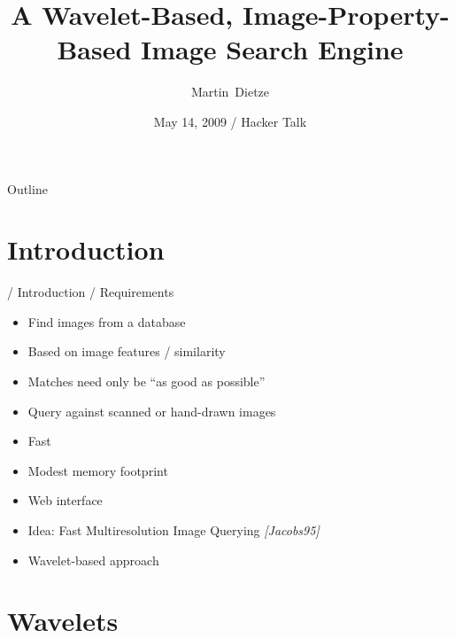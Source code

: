 \documentclass{beamer}
\title[Wavelet-Based Image Search] %
{A Wavelet-Based, Image-Property-Based Image Search Engine}
\author{Martin~Dietze}
\institute{Freiheit.com Technologies}
\date[Short Occasion] %
{May 14, 2009 / Hacker Talk}
\begin{document}
\begin{frame}
  \titlepage
\end{frame}

\begin{frame}{Outline}
  \tableofcontents
\end{frame}



\section{Introduction}

\begin{frame}{/ Introduction / Requirements}

  \begin{itemize}
  \item Find images from a database
  \item Based on image features / similarity
  \item Matches need only be ``as good as possible''
  \item Query against scanned or hand-drawn images
  \end{itemize}

  \pause
  \begin{itemize}
  \item Fast
  \item Modest memory footprint
  \item Web interface
  \end{itemize}

  \pause
  \begin{itemize}
  \item Idea: Fast Multiresolution Image Querying \emph{[Jacobs95]}
  \item Wavelet-based approach
  \end{itemize}
\end{frame}

\section{Wavelets}
\end{document}
